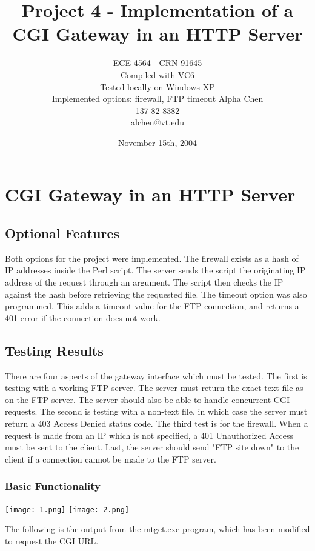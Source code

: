 \documentclass[11pt]{report}
\title{Project 4 - Implementation of a CGI Gateway in an HTTP Server}
\author{ECE 4564 - CRN 91645\\
Compiled with VC6\\
Tested locally on Windows XP\\
Implemented options: firewall, FTP timeout
Alpha Chen\\
137-82-8382\\
alchen@vt.edu}
\date{November 15th, 2004}
\begin{document}
\maketitle

\chapter{CGI Gateway in an HTTP Server}

\section{Optional Features}

Both options for the project were implemented. The firewall exists as a hash of IP addresses inside the Perl script. The server sends the script the originating IP address of the request through an argument. The script then checks the IP against the hash before retrieving the requested file. The timeout option was also programmed. This adds a timeout value for the FTP connection, and returns a 401 error if the connection does not work.

\newpage

\section{Testing Results}

There are four aspects of the gateway interface which must be tested. The first is testing with a working FTP server. The server must return the exact text file as on the FTP server. The server should also be able to handle concurrent CGI requests. The second is testing with a non-text file, in which case the server must return a 403 Access Denied status code. The third test is for the firewall. When a request is made from an IP which is not specified, a 401 Unauthorized Access must be sent to the client. Last, the server should send "FTP site down" to the client if a connection cannot be made to the FTP server.

\subsection{Basic Functionality}

\begin{center}
\texttt{[image: 1.png]}
\texttt{[image: 2.png]}
\end{center}

The following is the output from the mtget.exe program, which has been modified to request the CGI URL.
\end{document}
